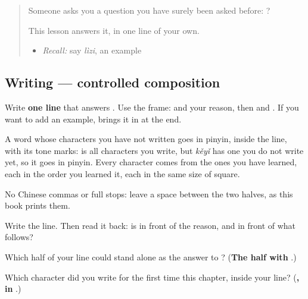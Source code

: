 \label{lesson:ZH-W281-one-reason}



\begin{quote}
Someone asks you a question you have surely been asked before: ?

This lesson answers it, in one line of your own.

\begin{itemize}
\raggedright
  \item \emph{Recall:} say \emph{lìzi}, an example
\end{itemize}
\end{quote}

\subsection*{Writing — controlled composition}
Write \textbf{one line} that answers . Use the frame:  and your reason, then  and . If you want to add an example,  brings it in at the end.

A word whose characters you have not written goes in pinyin, inside the line, with its tone marks:  is all characters you write, but \emph{kěyǐ} has one you do not write yet, so it goes in pinyin. Every character comes from the ones you have learned, each in the order you learned it, each in the same size of square.

No Chinese commas or full stops: leave a space between the two halves, as this book prints them.

Write the line. Then read it back: is  in front of the reason, and  in front of what follows?

\begin{tcolorbox}[breakable,colback=teal!4,colframe=teal!35!black,title={Before you move on}]
Which half of your line could stand alone as the answer to ? (\textbf{The half with }.)

Which character did you write for the first time this chapter, inside your line? (\textbf{, in }.)
\end{tcolorbox}
\section[Practice]{ }

\label{lesson:ZH-C281-practice}



